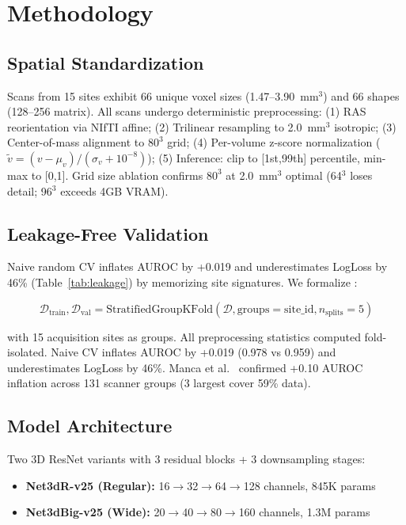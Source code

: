 \section{Methodology}
\label{sec:methodology}

\subsection{Spatial Standardization}
\label{sec:spatial}
Scans from 15 sites exhibit 66 unique voxel sizes (1.47--3.90~mm$^3$) and 66 shapes (128--256 matrix). All scans undergo deterministic preprocessing: (1) RAS reorientation via NIfTI affine; (2) Trilinear resampling to 2.0~mm$^3$ isotropic; (3) Center-of-mass alignment to $80^3$ grid; (4) Per-volume z-score normalization ($\tilde{v}=(v-\mu_v)/(\sigma_v+10^{-8})$); (5) Inference: clip to [1st,99th] percentile, min-max to [0,1]. Grid size ablation confirms $80^3$ at 2.0~mm$^3$ optimal (64$^3$ loses detail; 96$^3$ exceeds 4GB VRAM).

\subsection{Leakage-Free Validation}
\label{sec:leakage}
Naive random CV inflates AUROC by +0.019 and underestimates LogLoss by 46\% (Table~\ref{tab:leakage}) by memorizing site signatures. We formalize \cvname:

\begin{equation}
\mathcal{D}_{\text{train}},\mathcal{D}_{\text{val}} = \text{StratifiedGroupKFold}(\mathcal{D},\text{groups}=\text{site\_id},n_{\text{splits}}=5)
\end{equation}

with 15 acquisition sites as groups. All preprocessing statistics computed fold-isolated. Naive CV inflates AUROC by +0.019 (0.978 vs 0.959) and underestimates LogLoss by 46\%. Manca et al.~\cite{manca2024dat} confirmed +0.10 AUROC inflation across 131 scanner groups (3 largest cover 59\% data).

\subsection{Model Architecture}
\label{sec:architecture}
Two 3D ResNet variants with 3 residual blocks + 3 downsampling stages:

\begin{itemize}
\item \textbf{Net3dR-v25 (Regular):} 16$\to$32$\to$64$\to$128 channels, 845K params
\item \textbf{Net3dBig-v25 (Wide):} 20$\to$40$\to$80$\to$160 channels, 1.3M params
\end{itemize}

